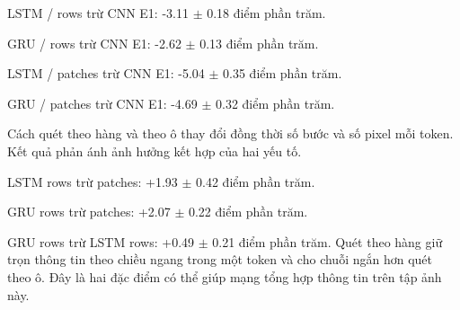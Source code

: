 LSTM / rows trừ CNN E1: -3.11 $\pm$ 0.18 điểm phần trăm.

GRU / rows trừ CNN E1: -2.62 $\pm$ 0.13 điểm phần trăm.

LSTM / patches trừ CNN E1: -5.04 $\pm$ 0.35 điểm phần trăm.

GRU / patches trừ CNN E1: -4.69 $\pm$ 0.32 điểm phần trăm.

Cách quét theo hàng và theo ô thay đổi đồng thời số bước và số pixel mỗi token. Kết quả phản ánh ảnh hưởng kết hợp của hai yếu tố.

LSTM rows trừ patches: +1.93 $\pm$ 0.42 điểm phần trăm.

GRU rows trừ patches: +2.07 $\pm$ 0.22 điểm phần trăm.

GRU rows trừ LSTM rows: +0.49 $\pm$ 0.21 điểm phần trăm. Quét theo hàng giữ trọn thông tin theo chiều ngang trong một token và cho chuỗi ngắn hơn quét theo ô. Đây là hai đặc điểm có thể giúp mạng tổng hợp thông tin trên tập ảnh này.
